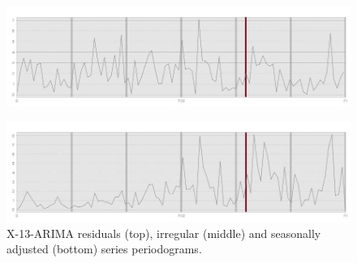 \documentclass[english,blauw]{cbsdiscussionpaper}
\begin{document}
\begin{figure}[h]
\includegraphics[width=\linewidth]{../images/capitolo3/XperIRR.jpg} 
\end{figure}
\begin{figure}[!h]
\includegraphics[width=\linewidth]{../images/capitolo3/XperSA.jpg} 
\caption{X-13-ARIMA residuals (top), irregular (middle) and seasonally adjusted (bottom) series periodograms.}
\label{fig:X13per}
\end{figure}
\end{document}
